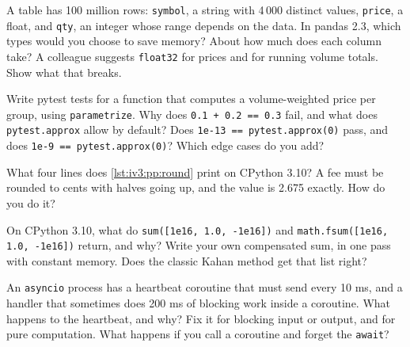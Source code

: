 \begin{question}\label{iq:iv3:python-and-pandas:25}
A table has 100 million rows: \texttt{symbol}, a string with 4\,000 distinct values, \texttt{price}, a float, and \texttt{qty}, an integer whose range depends on the data. In pandas 2.3, which types would you choose to save memory? About how much does each column take? A colleague suggests \texttt{float32} for prices and for running volume totals. Show what that breaks.
\end{question}

\begin{question}\label{iq:iv3:python-and-pandas:26}
Write pytest tests for a function that computes a volume-weighted price per group, using \texttt{parametrize}. Why does \texttt{0.1 + 0.2 == 0.3} fail, and what does \texttt{pytest.approx} allow by default? Does \texttt{1e-13 == pytest.approx(0)} pass, and does \texttt{1e-9 == pytest.approx(0)}? Which edge cases do you add?
\end{question}

\begin{question}\label{iq:iv3:python-and-pandas:27}
What four lines does \cref{lst:iv3:pp:round} print on CPython 3.10? A fee must be rounded to cents with halves going up, and the value is 2.675 exactly. How do you do it?
\label{lst:iv3:pp:round}
\end{question}

\begin{question}\label{iq:iv3:python-and-pandas:28}
On CPython 3.10, what do \texttt{sum([1e16, 1.0, -1e16])} and \texttt{math.fsum([1e16, 1.0, -1e16])} return, and why? Write your own compensated sum, in one pass with constant memory. Does the classic Kahan method get that list right?
\end{question}

\begin{question}\label{iq:iv3:python-and-pandas:29}
An \texttt{asyncio} process has a heartbeat coroutine that must send every 10 ms, and a handler that sometimes does 200 ms of blocking work inside a coroutine. What happens to the heartbeat, and why? Fix it for blocking input or output, and for pure computation. What happens if you call a coroutine and forget the \texttt{await}?
\end{question}

